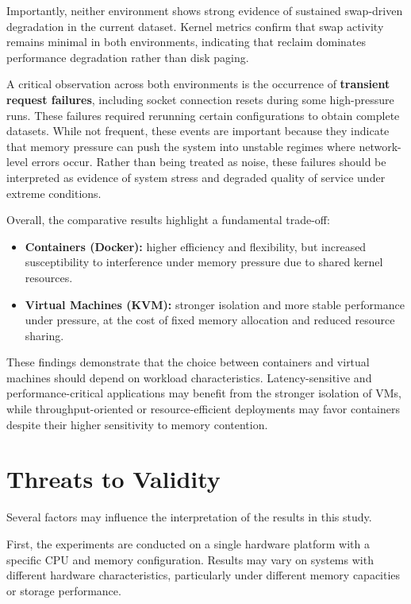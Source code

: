 \documentclass[conference]{IEEEtran}
\begin{document}
Importantly, neither environment shows strong evidence of sustained swap-driven degradation in the current dataset. Kernel metrics confirm that swap activity remains minimal in both environments, indicating that reclaim dominates performance degradation rather than disk paging.

A critical observation across both environments is the occurrence of \textbf{transient request failures}, including socket connection resets during some high-pressure runs. These failures required rerunning certain configurations to obtain complete datasets. While not frequent, these events are important because they indicate that memory pressure can push the system into unstable regimes where network-level errors occur. Rather than being treated as noise, these failures should be interpreted as evidence of system stress and degraded quality of service under extreme conditions.

Overall, the comparative results highlight a fundamental trade-off:

\begin{itemize}
\item \textbf{Containers (Docker):} higher efficiency and flexibility, but increased susceptibility to interference under memory pressure due to shared kernel resources.
\item \textbf{Virtual Machines (KVM):} stronger isolation and more stable performance under pressure, at the cost of fixed memory allocation and reduced resource sharing.
\end{itemize}

These findings demonstrate that the choice between containers and virtual machines should depend on workload characteristics. Latency-sensitive and performance-critical applications may benefit from the stronger isolation of VMs, while throughput-oriented or resource-efficient deployments may favor containers despite their higher sensitivity to memory contention.

\section{Threats to Validity}

Several factors may influence the interpretation of the results in this study.

First, the experiments are conducted on a single hardware platform with a specific CPU and memory configuration. Results may vary on systems with different hardware characteristics, particularly under different memory capacities or storage performance.
\end{document}
